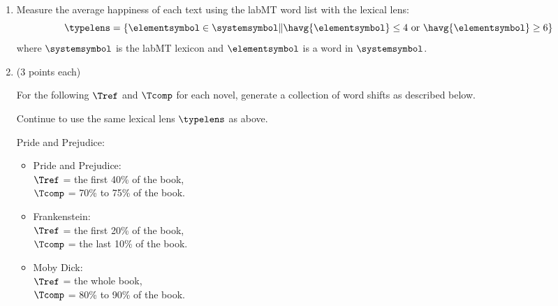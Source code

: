 \begin{enumerate}

\item

  Measure the average happiness of each text
  using the labMT word list
  with the lexical lens:
  \begin{equation}
    \typelens
    =
    \left\{
    \elementsymbol
    \in
    \systemsymbol
    \|
    \havg{\elementsymbol} \le 4
    \
    \mbox{or}
    \
    \havg{\elementsymbol} \ge 6
    \right\}
    \label{eq:lexicallens}
  \end{equation}
  where
  $\systemsymbol$ is the labMT lexicon
  and
  $\elementsymbol$ is a word in $\systemsymbol$.
  

\item (3 points each)

  For the following 
  $\Tref$
  and
  $\Tcomp$
  for each novel,
  generate a collection of word shifts
  as described below.

  Continue to use the same lexical lens $\typelens$ as above.

  Pride and Prejudice:


  \begin{itemize}
  \item
    Pride and Prejudice:\\
    $\Tref$ = the first 40\% of the book,\\
    $\Tcomp$ = 70\% to 75\% of the book.
  \item 
    Frankenstein:\\
    $\Tref$ =  the first 20\% of the book,\\
    $\Tcomp$ = the last 10\% of the book.
  \item
    Moby Dick:\\
    $\Tref$ =  the whole book,\\
    $\Tcomp$ = 80\% to 90\% of the book.
  \end{itemize}


\end{enumerate}

